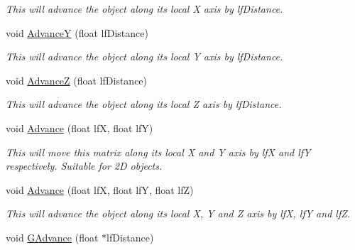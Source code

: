 \begin{DoxyCompactItemize}
\begin{DoxyCompactList}\small\item\em This will advance the object along its local X axis by lfDistance. \end{DoxyCompactList}\item 
\hypertarget{classc_matrix4_ae28d0f2cfe996ec5422cdaec98f30c9a}{
void \hyperlink{classc_matrix4_ae28d0f2cfe996ec5422cdaec98f30c9a}{AdvanceY} (float lfDistance)}
\label{classc_matrix4_ae28d0f2cfe996ec5422cdaec98f30c9a}

\begin{DoxyCompactList}\small\item\em This will advance the object along its local Y axis by lfDistance. \end{DoxyCompactList}\item 
\hypertarget{classc_matrix4_a31d0d26e3b91628365871ad10dc33f8e}{
void \hyperlink{classc_matrix4_a31d0d26e3b91628365871ad10dc33f8e}{AdvanceZ} (float lfDistance)}
\label{classc_matrix4_a31d0d26e3b91628365871ad10dc33f8e}

\begin{DoxyCompactList}\small\item\em This will advance the object along its local Z axis by lfDistance. \end{DoxyCompactList}\item 
\hypertarget{classc_matrix4_ab956ec27a465b889126632475fd7d703}{
void \hyperlink{classc_matrix4_ab956ec27a465b889126632475fd7d703}{Advance} (float lfX, float lfY)}
\label{classc_matrix4_ab956ec27a465b889126632475fd7d703}

\begin{DoxyCompactList}\small\item\em This will move this matrix along its local X and Y axis by lfX and lfY respectively. Suitable for 2D objects. \end{DoxyCompactList}\item 
\hypertarget{classc_matrix4_a00d27c2daab0e05c403c8fb86445fb81}{
void \hyperlink{classc_matrix4_a00d27c2daab0e05c403c8fb86445fb81}{Advance} (float lfX, float lfY, float lfZ)}
\label{classc_matrix4_a00d27c2daab0e05c403c8fb86445fb81}

\begin{DoxyCompactList}\small\item\em This will advance the object along its local X, Y and Z axis by lfX, lfY and lfZ. \end{DoxyCompactList}\item 
\hypertarget{classc_matrix4_a92335a0e15b30c55f4838f1ab3dea1af}{
void \hyperlink{classc_matrix4_a92335a0e15b30c55f4838f1ab3dea1af}{GAdvance} (float $\ast$lfDistance)}
\label{classc_matrix4_a92335a0e15b30c55f4838f1ab3dea1af}


\end{DoxyCompactItemize}

